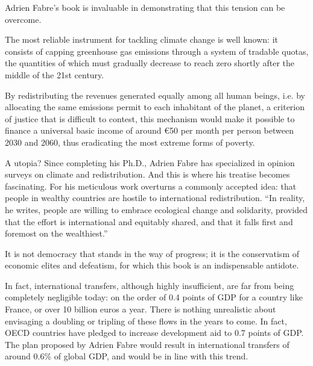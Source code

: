 \documentclass[a5paper,english,openany]{memoir}
\begin{document}
Adrien Fabre's book is invaluable in demonstrating that this tension can be overcome. 

The most reliable instrument for tackling climate change is well known: it consists of capping greenhouse gas emissions through a system of tradable quotas, the quantities of which must gradually decrease to reach zero shortly after the middle of the 21st century. 

By redistributing the revenues generated equally among all human beings, i.e. by allocating the same emissions permit to each inhabitant of the planet, a criterion of justice that is difficult to contest, %
this mechanism would make it possible to finance a universal basic income of around \euro{}50 per month per person between 2030 and 2060, thus eradicating the most extreme forms of poverty. 

A utopia? Since completing his Ph.D., Adrien Fabre has specialized in opinion surveys on climate and redistribution. And this is where his treatise becomes fascinating. For his meticulous work overturns a commonly accepted idea: %
that people in wealthy countries are hostile to international redistribution. ``In reality, he writes, people are willing to embrace ecological change and solidarity, provided that the effort is international and equitably shared, and that it falls first and foremost on the wealthiest.''

It is not democracy that stands in the way of progress; %
it is the conservatism of economic elites and defeatism, for which this book is an indispensable antidote.

In fact, international transfers, although highly insufficient, are far from being completely negligible today: %
on the order of 0.4 points of GDP for a country like France, or over 10 billion euros a year. There is nothing unrealistic about envisaging a doubling or tripling of these flows in the years to come. In fact, OECD countries have pledged to increase development aid to 0.7 points of GDP. The plan proposed by Adrien Fabre would result in international
transfers of around 0.6\% of global GDP, and would be in line with this trend. 
\end{document}
